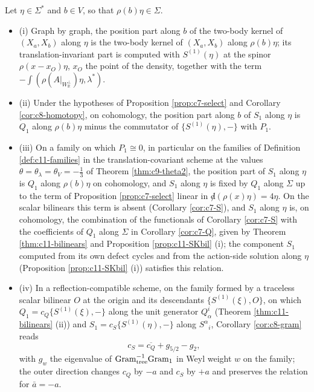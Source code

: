 \begin{proposition}
\label{prop:c11-S}
Let $\eta\in\Sigma^*$ and $b\in V$, so that $\rho(b)\eta\in\Sigma$.
\begin{itemize}
\item (i) Graph by graph, the position part along $b$ of the two-body kernel of $(X_a,X_b)$ along $\eta$ is the two-body kernel of $(X_a,X_b)$ along $\rho(b)\eta$; its translation-invariant part is computed with $S^{(1)}(\eta)$ at the spinor $\rho(x-x_O)\eta$, $x_O$ the point of the density, together with the term $-\int(\rho(A|_{W_{\mathbb R}^\perp})\eta,\lambda^*)$.
\item (ii) Under the hypotheses of Proposition \ref{prop:c7-select} and Corollary \ref{cor:c8-homotopy}, on cohomology, the position part along $b$ of $S_1$ along $\eta$ is $Q_1$ along $\rho(b)\eta$ minus the commutator of $\{S^{(1)}(\eta),-\}$ with $P_1$.
\item (iii) On a family on which $P_1\cong0$, in particular on the families of Definition \ref{def:c11-families} in the translation-covariant scheme at the values $\theta=\theta_\lambda=\theta_V=-\tfrac13$ of Theorem \ref{thm:c9-theta2}, the position part of $S_1$ along $\eta$ is $Q_1$ along $\rho(b)\eta$ on cohomology, and $S_1$ along $\eta$ is fixed by $Q_1$ along $\Sigma$ up to the term of Proposition \ref{prop:c7-select} linear in ${\not d}(\rho(x)\eta)=4\eta$. On the scalar bilinears this term is absent (Corollary \ref{cor:c7-S}), and $S_1$ along $\eta$ is, on cohomology, the combination of the functionals of Corollary \ref{cor:c7-S} with the coefficients of $Q_1$ along $\Sigma$ in Corollary \ref{cor:c7-Q}, given by Theorem \ref{thm:c11-bilinears} and Proposition \ref{prop:c11-SKbil} (i); the component $S_1$ computed from its own defect cycles and from the action-side solution along $\eta$ (Proposition \ref{prop:c11-SKbil} (i)) satisfies this relation.
\item (iv) In a reflection-compatible scheme, on the family formed by a traceless scalar bilinear $O$ at the origin and its descendants $\{S^{(1)}(\xi),O\}$, on which $Q_1=c_Q\{S^{(1)}(\xi),-\}$ along the unit generator $Q^i_\alpha$ (Theorem \ref{thm:c11-bilinears} (ii)) and $S_1=c_S\{S^{(1)}(\eta),-\}$ along $S^\alpha{}_i$, Corollary \ref{cor:c8-gram} reads
\[
c_S=\overline{c_Q}+g_{5/2}-g_2,
\]
with $g_w$ the eigenvalue of $\mathrm{Gram}_{\rm tree}^{-1}\mathrm{Gram}_{\rm 1}$ in Weyl weight $w$ on the family; the outer direction changes $c_Q$ by $-a$ and $c_S$ by $+a$ and preserves the relation for $\bar a=-a$.
\end{itemize}
\end{proposition}

